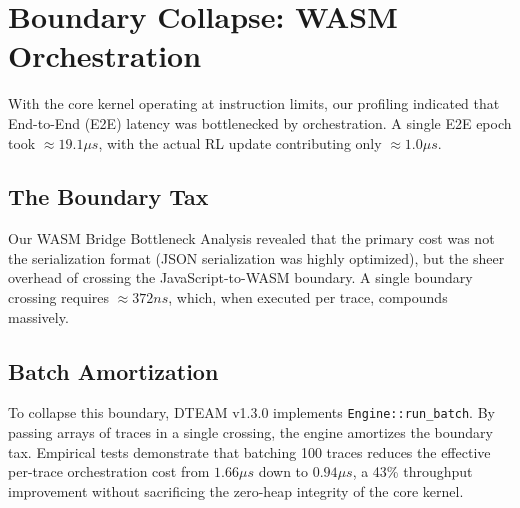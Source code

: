 \chapter{Boundary Collapse: WASM Orchestration}
With the core kernel operating at instruction limits, our profiling indicated that End-to-End (E2E) latency was bottlenecked by orchestration. A single E2E epoch took $\approx 19.1 \mu s$, with the actual RL update contributing only $\approx 1.0 \mu s$.

\section{The Boundary Tax}
Our WASM Bridge Bottleneck Analysis revealed that the primary cost was not the serialization format (JSON serialization was highly optimized), but the sheer overhead of crossing the JavaScript-to-WASM boundary. A single boundary crossing requires $\approx 372 ns$, which, when executed per trace, compounds massively.

\section{Batch Amortization}
To collapse this boundary, DTEAM v1.3.0 implements \texttt{Engine::run\_batch}. By passing arrays of traces in a single crossing, the engine amortizes the boundary tax. Empirical tests demonstrate that batching 100 traces reduces the effective per-trace orchestration cost from $1.66 \mu s$ down to $0.94 \mu s$, a 43\% throughput improvement without sacrificing the zero-heap integrity of the core kernel.
